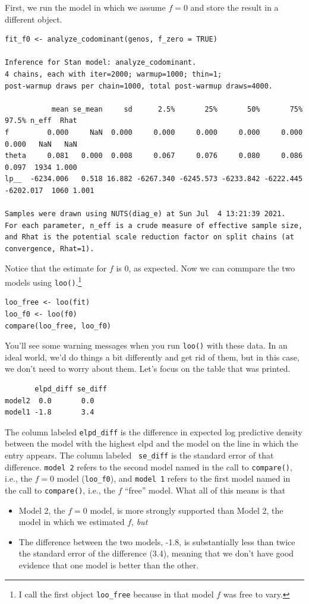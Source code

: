 First, we run the model in which we assume $f = 0$ and store the
result in a different object.
\begin{verbatim}
fit_f0 <- analyze_codominant(genos, f_zero = TRUE)

Inference for Stan model: analyze_codominant.
4 chains, each with iter=2000; warmup=1000; thin=1; 
post-warmup draws per chain=1000, total post-warmup draws=4000.

           mean se_mean     sd      2.5%       25%       50%       75%     97.5% n_eff  Rhat
f         0.000     NaN  0.000     0.000     0.000     0.000     0.000     0.000   NaN   NaN
theta     0.081   0.000  0.008     0.067     0.076     0.080     0.086     0.097  1934 1.000
lp__  -6234.006   0.518 16.882 -6267.340 -6245.573 -6233.842 -6222.445 -6202.017  1060 1.001

Samples were drawn using NUTS(diag_e) at Sun Jul  4 13:21:39 2021.
For each parameter, n_eff is a crude measure of effective sample size,
and Rhat is the potential scale reduction factor on split chains (at 
convergence, Rhat=1).
\end{verbatim}
Notice that the estimate for $f$ is 0, as expected. Now we can
commpare the two models using {\tt loo()}.\footnote{I call the first
  object {\tt loo\_free} because in that model $f$ was free to vary.}
\begin{verbatim}
loo_free <- loo(fit)
loo_f0 <- loo(f0)
compare(loo_free, loo_f0)
\end{verbatim}
You'll see some warning messages when you run {\tt loo()} with these
data. In an ideal world, we'd do things a bit differently and get rid
of them, but in this case, we don't need to worry about them. Let's
focus on the table that was printed.
\begin{verbatim}
       elpd_diff se_diff
model2  0.0       0.0   
model1 -1.8       3.4   
\end{verbatim}
The column labeled {\tt elpd\_diff} is the difference in expected log
predictive density between the model with the highest elpd and the
model on the line in which the entry appears. The column labeled {\tt
  se\_diff} is the standard error of that difference. {\tt model 2}
refers to the second model named in the call to {\tt compare()}, i.e.,
the $f=0$ model ({\tt loo\_f0}), and {\tt model 1} refers to the first
model named in the call to {\tt compare()}, i.e., the $f$ ``free''
model. What all of this means is that

\begin{itemize}

  \item Model 2, the $f=0$ model, is more strongly supported than
    Model 2, the model in which we estimated $f$, {\it but}

  \item The difference between the two models, -1.8, is substantially
    less than twice the standard error of the difference (3.4),
    meaning that we don't have good evidence that one model is better
    than the other.
    
\end{itemize}

